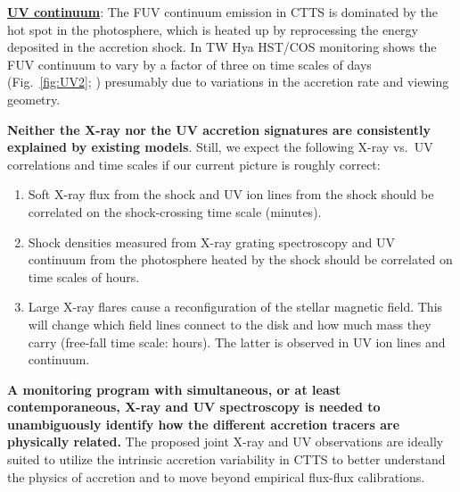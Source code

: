 \documentclass[letterpaper,11pt,twocolumn]{article}
\begin{document}
\underline{\bf UV continuum}: The FUV continuum emission in CTTS is
dominated by the hot spot in the photosphere, which is heated up by
reprocessing the energy deposited in the accretion shock. In
TW Hya HST/COS monitoring shows the FUV
continuum to vary by a factor of three on time scales of days
(Fig.~\ref{fig:UV2}; ) presumably due to variations in the
accretion rate and viewing geometry.


{\bf Neither the X-ray nor the UV accretion signatures are consistently explained by existing models}. Still, we expect the following X-ray vs.\ UV correlations and time scales if our current picture is roughly correct:
\begin{enumerate}
    \itemsep1pt
    \item Soft X-ray flux from the shock and UV ion lines from the shock should be correlated on the shock-crossing time scale (minutes).
    \item Shock densities measured from X-ray grating
      spectroscopy and UV continuum from the
      photosphere heated by the shock should be correlated on time
      scales of hours.
    \item Large X-ray flares cause a reconfiguration of the stellar
      magnetic field. This will change which field lines connect to
      the disk and how much mass they carry (free-fall time scale:
      hours). The latter is observed in UV ion lines and continuum.
\end{enumerate}

\textbf{A monitoring program with simultaneous, or at least contemporaneous, X-ray and UV spectroscopy
is needed to unambiguously identify how the different 
accretion tracers are physically related.} The proposed joint X-ray and UV observations are ideally
suited to utilize the intrinsic accretion variability in
CTTS to better understand the physics of accretion and to move beyond 
empirical flux-flux calibrations. 
\end{document}
